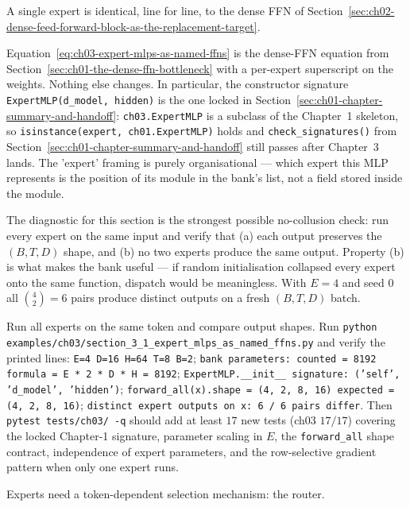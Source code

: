 

A single expert is identical, line for line, to the dense FFN of Section~\ref{sec:ch02-dense-feed-forward-block-as-the-replacement-target}.



Equation~\ref{eq:ch03-expert-mlps-as-named-ffns} is the dense-FFN equation from Section~\ref{sec:ch01-the-dense-ffn-bottleneck} with a per-expert superscript on the weights. Nothing else changes. In particular, the constructor signature \texttt{ExpertMLP(d\_model, hidden)} is the one locked in Section~\ref{sec:ch01-chapter-summary-and-handoff}: \texttt{ch03.ExpertMLP} is a subclass of the Chapter~1 skeleton, so \texttt{isinstance(expert, ch01.ExpertMLP)} holds and \texttt{check\_signatures()} from Section~\ref{sec:ch01-chapter-summary-and-handoff} still passes after Chapter~3 lands. The 'expert' framing is purely organisational --- which expert this MLP represents is the position of its module in the bank's list, not a field stored inside the module.



The diagnostic for this section is the strongest possible no-collusion check: run every expert on the same input and verify that (a) each output preserves the $(B, T, D)$ shape, and (b) no two experts produce the same output. Property (b) is what makes the bank useful --- if random initialisation collapsed every expert onto the same function, dispatch would be meaningless. With $E = 4$ and seed $0$ all $\binom{4}{2} = 6$ pairs produce distinct outputs on a fresh $(B, T, D)$ batch.

\begin{checkpointbox}
Run all experts on the same token and compare output shapes. Run \texttt{python examples/ch03/section\_3\_1\_expert\_mlps\_as\_named\_ffns.py} and verify the printed lines: \texttt{E=4  D=16  H=64  T=8  B=2}; \texttt{bank parameters: counted = 8192    formula = E * 2 * D * H = 8192}; \texttt{ExpertMLP.\_\_init\_\_ signature: ('self', 'd\_model', 'hidden')}; \texttt{forward\_all(x).shape = (4, 2, 8, 16)    expected = (4, 2, 8, 16)}; \texttt{distinct expert outputs on x: 6 / 6 pairs differ}. Then \texttt{pytest tests/ch03/ -q} should add at least $17$ new tests (ch03 $17/17$) covering the locked Chapter-1 signature, parameter scaling in $E$, the \texttt{forward\_all} shape contract, independence of expert parameters, and the row-selective gradient pattern when only one expert runs.
\end{checkpointbox}

Experts need a token-dependent selection mechanism: the router.

